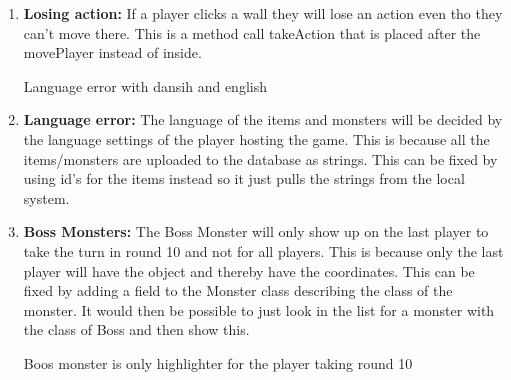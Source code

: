 \begin{enumerate}
	\item \textbf{Losing action:} If a player clicks a wall they will lose an action even tho they can't move there. This is a method call takeAction that is placed after the movePlayer instead of inside.
	
	Language error with dansih and english
	\item \textbf{Language error:} The language of the items and monsters will be decided by the language settings of the player hosting the game. This is because all the items/monsters are uploaded to the database as strings. This can be fixed by using id's for the items instead so it just pulls the strings from the local system.
	
	\item \textbf{Boss Monsters:} The Boss Monster will only show up on the last player to take the turn in round 10 and not for all players. This is because only the last player will have the object and thereby have the coordinates. This can be fixed by adding a field to the Monster class describing the class of the monster. It would then be possible to just look in the list for a monster with the class of Boss and then show this.
	
	Boos monster is only highlighter for the player taking round 10
	
	
	
\end{enumerate}